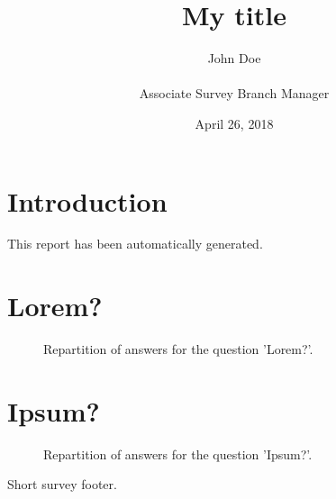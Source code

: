 \documentclass[11pt]{article}
\date{April 26, 2018}
\title{My title}
\author{John Doe\\\\Associate Survey Branch Manager}
\begin{document}
\maketitle{}
\section*{Introduction}
This report has been automatically generated.


\clearpage{}
\section{Lorem?}

\label{sec:7}


\begin{figure}[h!]
    \caption{\label{figure:q7-1}Repartition of answers for the question 'Lorem?'.}
\end{figure}



\clearpage{}
\section{Ipsum?}

\label{sec:8}


\begin{figure}[h!]
    \caption{\label{figure:q8-1}Repartition of answers for the question 'Ipsum?'.}
\end{figure}


Short survey footer.
\end{document}
